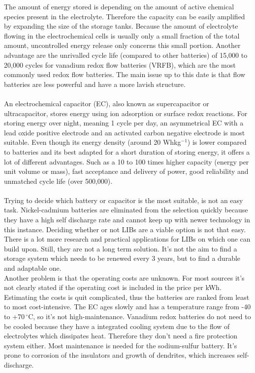 \begin{parcolumns}[colwidths={1=2.5 cm, 2=10 cm, 3=2.5cm}]{3}
{The amount of energy stored is depending on the amount of active chemical species present in the electrolyte. Therefore the capacity can be easily amplified by expanding the size of the storage tanks. Because the amount of electrolyte flowing in the electrochemical cells is usually only a small fraction of the total amount, uncontrolled energy release only concerns this small portion. Another advantage are the unrivalled cycle life (compared to other batteries) of 15,000 to 20,000 cycles for vanadium redox flow batteries (VRFB), which are the most commonly used redox flow batteries. 
The main issue up to this date is that flow batteries are less powerful and have a more lavish structure. \\\\
An electrochemical capacitor (EC), also known as supercapacitor or ultracapacitor, stores energy using ion adsorption or surface redox reactions. For storing energy over night, meaning 1 cycle per day, an asymmetrical EC with a lead oxide positive electrode and an activated carbon negative electrode is most suitable. Even though its energy density (around 20 Whkg$^{-1}$) is lower compared to batteries and its best adapted for a short duration of storing energy, it offers a lot of different advantages. Such as a 10 to 100 times higher capacity (energy per unit volume or mass), fast acceptance and delivery of power, good reliability and unmatched cycle life (over 500,000).  \\\\
Trying to decide which battery or capacitor is the most suitable, is not an easy task. Nickel-cadmium batteries are eliminated from the selection quickly because they have a high self discharge rate and cannot keep up with newer technology in this instance. Deciding whether or not LIBs are a viable option is not that easy. There is a lot more research and practical applications for LIBs on which one can build upon. Still, they are not a long term solution. It's not the aim to find a storage system which needs to be renewed every  3 years, but to find a durable and adaptable one. \\ Another problem is that the operating costs are unknown. For most sources it's not clearly stated if the operating cost is included in the price per kWh. Estimating the costs is quit complicated, thus the batteries are ranked from least to most cost-intensive. The EC ages slowly and has a temperature range from -40 to +70\,$^\circ$C, so it's not high-maintenance. Vanadium redox batteries do not need to be cooled because they have a integrated cooling system due to the flow of electrolytes which dissipates heat. Therefore they don't need a fire protection system either. Most maintenance is needed for the sodium-sulfur battery. It's prone to corrosion of the insulators and growth of dendrites, which increases self-discharge.\\\\
}
\end{parcolumns}
